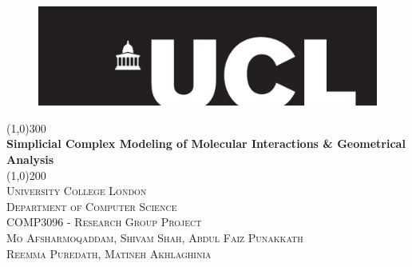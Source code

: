 \documentclass[9pt]{article}
\begin{document}
\begin{titlepage}
\begin{center}
\begin{figure}[t]
\hspace*{0.35cm}\includegraphics[width=1.0\textwidth]{uclLogo}\\
\end{figure}
\line(1,0){300}\\
[0.25in]
\huge{\bfseries Simplicial Complex Modeling of Molecular Interactions \& Geometrical Analysis}\\
[2mm]
\line(1,0){200}\\
[1.5cm]
\textsc{\LARGE University College London}\\
\textsc{\normalsize Department of Computer Science}\\
\textsc{\normalsize COMP3096 - Research Group Project}\\
\textsc{\normalsize Mo Afsharmoqaddam, Shivam Shah, Abdul Faiz Punakkath}\\
\textsc{\normalsize Reemma Puredath, Matineh Akhlaghinia}\\

\end{center}

\end{titlepage}

\newpage
\end{document}
